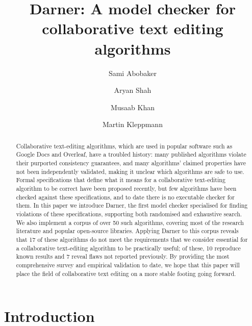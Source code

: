 \documentclass[sigplan,10pt,review,anonymous]{acmart}
\begin{document}
\title{Darner: A model checker for collaborative text editing algorithms}


\author{Sami Abobaker}

\author{Aryan Shah}

\author{Musaab Khan}

\author{Martin Kleppmann}


\begin{abstract}
    Collaborative text-editing algorithms, which are used in popular software such as Google Docs and Overleaf, have a troubled history: many published algorithms violate their purported consistency guarantees, and many algorithms' claimed properties have not been independently validated, making it unclear which algorithms are safe to use.
    Formal specifications that define what it means for a collaborative text-editing algorithm to be correct have been proposed recently, but few algorithms have been checked against these specifications, and to date there is no executable checker for them. 
    In this paper we introduce Darner, the first model checker specialised for finding violations of these specifications, supporting both randomised and exhaustive search.
    We also implement a corpus of over 50 such algorithms, covering most of the research literature and popular open-source libraries.
    Applying Darner to this corpus reveals that 17 of these algorithms do not meet the requirements that we consider essential for a collaborative text-editing algorithm to be practically useful; of these, 10 reproduce known results and 7 reveal flaws not reported previously.
    By providing the most comprehensive survey and empirical validation to date, we hope that this paper will place the field of collaborative text editing on a more stable footing going forward.
\end{abstract}



\maketitle

\section{Introduction}
\end{document}
